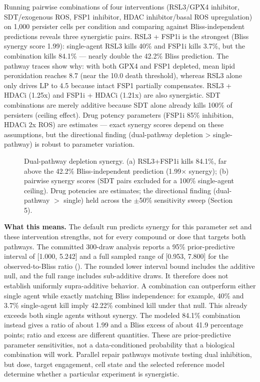 \documentclass[11pt,twoside,openright]{report}
\begin{document}
Running pairwise combinations of four interventions (RSL3/GPX4 inhibitor, SDT/exogenous ROS, FSP1 inhibitor, HDAC inhibitor/basal ROS upregulation) on 1,000 persister cells per condition and comparing against Bliss-independent predictions reveals three synergistic pairs. RSL3 + FSP1i is the strongest (Bliss synergy score 1.99): single-agent RSL3 kills 40\% and FSP1i kills 3.7\%, but the combination kills 84.1\% --- nearly double the 42.2\% Bliss prediction. The pathway traces show why: with both GPX4 and FSP1 depleted, mean lipid peroxidation reaches 8.7 (near the 10.0 death threshold), whereas RSL3 alone only drives LP to 4.5 because intact FSP1 partially compensates. RSL3 + HDACi (1.25x) and FSP1i + HDACi (1.21x) are also synergistic. SDT combinations are merely additive because SDT alone already kills 100\% of persisters (ceiling effect). Drug potency parameters (FSP1i 85\% inhibition, HDACi 2x ROS) are estimates --- exact synergy scores depend on these assumptions, but the directional finding (dual-pathway depletion > single-pathway) is robust to parameter variation.

\begin{figure}[tbp]
\setcounter{figure}{21}
\caption{Dual-pathway depletion synergy. (a) RSL3+FSP1i kills 84.1\%, far above the 42.2\% Bliss-independent prediction (1.99$\times$ synergy); (b) pairwise synergy scores (SDT pairs excluded for a 100\% single-agent ceiling). Drug potencies are estimates; the directional finding (dual-pathway $>$ single) held across the $\pm$50\% sensitivity sweep (Section 5).}
\label{fig:fig25_bliss_synergy}
\end{figure}

\textbf{What this means.} The default run predicts synergy for this parameter set and these intervention strengths, not for every compound or dose that targets both pathways. The committed 300-draw analysis reports a 95\% prior-predictive interval of [1.000, 5.242] and a full sampled range of [0.953, 7.800] for the observed-to-Bliss ratio (). The rounded lower interval bound includes the additive null, and the full range includes sub-additive draws. It therefore does not establish uniformly supra-additive behavior. A combination can outperform either single agent while exactly matching Bliss independence: for example, 40\% and 3.7\% single-agent kill imply 42.22\% combined kill under that null. This already exceeds both single agents without synergy. The modeled 84.1\% combination instead gives a ratio of about 1.99 and a Bliss excess of about 41.9 percentage points; ratio and excess are different quantities. These are prior-predictive parameter sensitivities, not a data-conditioned probability that a biological combination will work. Parallel repair pathways motivate testing dual inhibition, but dose, target engagement, cell state and the selected reference model determine whether a particular experiment is synergistic.
\end{document}
